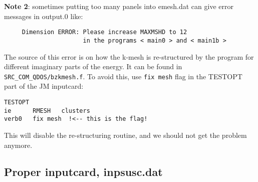 \documentclass[11pt,fleqn]{book} %
\begin{document}
\begin{itemize}
\textbf{Note 2}: sometimes putting too many panels into emesh.dat can give error messages
in output.0 like:
\begin{VBox}
\begin{verbatim}
     Dimension ERROR: Please increase MAXMSHD to 12
                      in the programs < main0 > and < main1b >

\end{verbatim}
\end{VBox}
The source of this error is on how the k-mesh is re-structured by
the program for different imaginary parts of the energy. It can be found in
\verb|SRC_COM_QDOS/bzkmesh.f|. To avoid this, use
\verb|fix mesh| flag in the TESTOPT part of the JM inputcard:
\begin{VBox}
\begin{verbatim}
TESTOPT
ie      RMESH   clusters
verb0   fix mesh  !<-- this is the flag!
\end{verbatim}
\end{VBox}
This will disable the re-structuring routine, and we should not get the problem anymore.

\end{itemize}

\subsection{Proper inputcard, inpsusc.dat}
\end{document}
